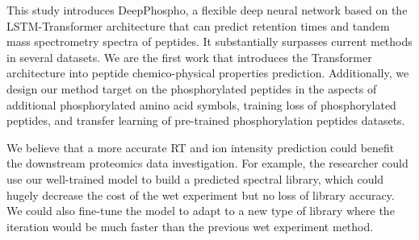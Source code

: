 This study introduces DeepPhospho, a flexible deep neural network based on the LSTM-Transformer architecture that can predict retention times and tandem mass spectrometry spectra of peptides. It substantially surpasses current methods in several datasets. We are the first work that introduces the Transformer architecture into peptide chemico-physical properties prediction. Additionally, we design our method target on the phosphorylated peptides in the aspects of additional phosphorylated amino acid symbols, training loss of phosphorylated peptides, and transfer learning of pre-trained phosphorylation peptides datasets.

We believe that a more accurate RT and ion intensity prediction could benefit the downstream proteomics data investigation. For example, the researcher could use our well-trained model to build a predicted spectral library, which could hugely decrease the cost of the wet experiment but no loss of library accuracy. We could also fine-tune the model to adapt to a new type of library where the iteration would be much faster than the previous wet experiment method. 
